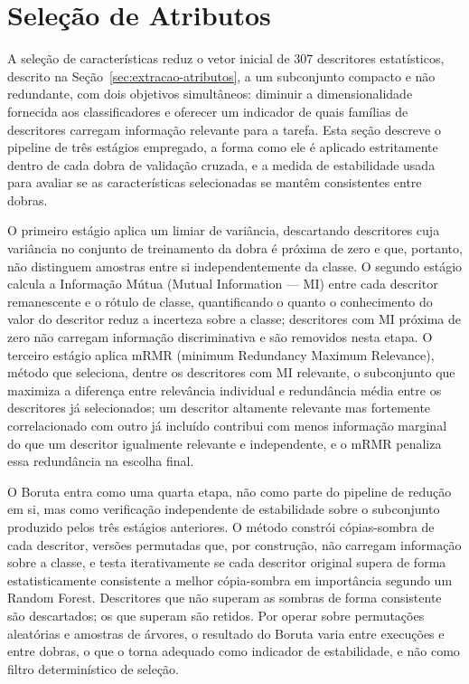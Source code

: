 \section{Seleção de Atributos}
\label{sec:metodologia-selecao}

A seleção de características reduz o vetor inicial de 307 descritores estatísticos, descrito na Seção~\ref{sec:extracao-atributos}, a um subconjunto compacto e não redundante, com dois objetivos simultâneos: diminuir a dimensionalidade fornecida aos classificadores e oferecer um indicador de quais famílias de descritores carregam informação relevante para a tarefa. Esta seção descreve o pipeline de três estágios empregado, a forma como ele é aplicado estritamente dentro de cada dobra de validação cruzada, e a medida de estabilidade usada para avaliar se as características selecionadas se mantêm consistentes entre dobras.

O primeiro estágio aplica um limiar de variância, descartando descritores cuja variância no conjunto de treinamento da dobra é próxima de zero e que, portanto, não distinguem amostras entre si independentemente da classe. O segundo estágio calcula a Informação Mútua (Mutual Information — MI) entre cada descritor remanescente e o rótulo de classe, quantificando o quanto o conhecimento do valor do descritor reduz a incerteza sobre a classe; descritores com MI próxima de zero não carregam informação discriminativa e são removidos nesta etapa. O terceiro estágio aplica mRMR (minimum Redundancy Maximum Relevance), método que seleciona, dentre os descritores com MI relevante, o subconjunto que maximiza a diferença entre relevância individual e redundância média entre os descritores já selecionados; um descritor altamente relevante mas fortemente correlacionado com outro já incluído contribui com menos informação marginal do que um descritor igualmente relevante e independente, e o mRMR penaliza essa redundância na escolha final.

O Boruta entra como uma quarta etapa, não como parte do pipeline de redução em si, mas como verificação independente de estabilidade sobre o subconjunto produzido pelos três estágios anteriores. O método constrói cópias-sombra de cada descritor, versões permutadas que, por construção, não carregam informação sobre a classe, e testa iterativamente se cada descritor original supera de forma estatisticamente consistente a melhor cópia-sombra em importância segundo um Random Forest. Descritores que não superam as sombras de forma consistente são descartados; os que superam são retidos. Por operar sobre permutações aleatórias e amostras de árvores, o resultado do Boruta varia entre execuções e entre dobras, o que o torna adequado como indicador de estabilidade, e não como filtro determinístico de seleção.

